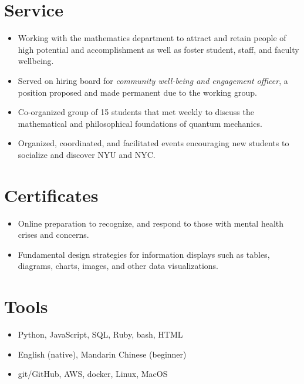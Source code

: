 \documentclass{cultvoucher}
\begin{document}
\section{Service}

\begin{itemize}
	\item Working with the mathematics department to attract and retain people of high potential and accomplishment as well as foster student, staff, and faculty wellbeing.
	\item Served on hiring board for \emph{community well-being and engagement officer}, a position proposed and made permanent due to the working group.
\end{itemize}

\begin{itemize}
	\item Co-organized group of 15 students that met weekly to discuss the mathematical and philosophical foundations of quantum mechanics.
\end{itemize}

\begin{itemize}
	\item Organized, coordinated, and facilitated events encouraging new students to socialize and discover NYU and NYC.
\end{itemize}

\section{Certificates}
\begin{itemize}
	\item Online preparation to recognize, and respond to those with mental health crises and concerns.
\end{itemize}
\begin{itemize}
	\item Fundamental design strategies for information displays such as tables, diagrams, charts, images, and other data visualizations.
\end{itemize}


\section{Tools}
\begin{itemize}
	\item Python, JavaScript, SQL, Ruby, bash, HTML
	\item English (native), Mandarin Chinese (beginner)
\end{itemize}
\begin{itemize}
	\item git/GitHub, AWS, docker, Linux, MacOS
\end{itemize}
\end{document}
